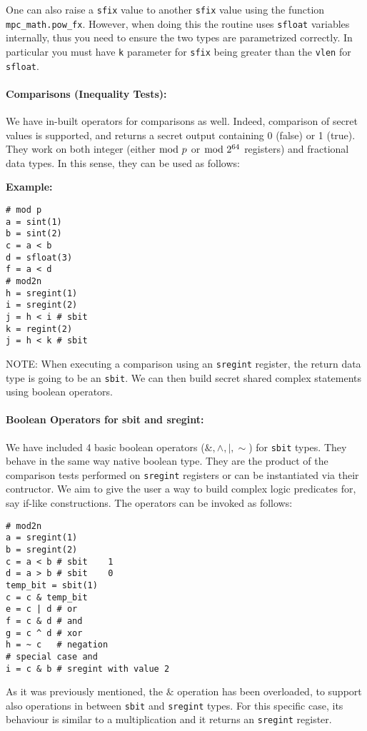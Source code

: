 One can also raise a \verb|sfix| value to another \verb|sfix| value using the
function \verb|mpc_math.pow_fx|. However, when doing this the routine uses
\verb|sfloat| variables internally, thus you need to ensure the two types
are parametrized correctly.
In particular you must have \verb|k| parameter for \verb|sfix| being greater than
the \verb|vlen| for \verb|sfloat|.

\paragraph{Comparisons (Inequality Tests):}
We have in-built operators for comparisons as well.
Indeed, comparison of secret values is supported,
and returns a secret output containing 0 (false) or 1 (true).
They work on both integer (either $\bmod \; p$ or $\bmod \; 2^{64}$ registers) and fractional data types.
In this sense, they can be used as follows:

\noindent
\textbf{Example:}
\begin{lstlisting}
# mod p
a = sint(1)
b = sint(2)
c = a < b
d = sfloat(3)
f = a < d
# mod2n
h = sregint(1)
i = sregint(2)
j = h < i # sbit
k = regint(2)
j = h < k # sbit
\end{lstlisting}

\noindent
NOTE: When executing a comparison using an \verb|sregint| register, the return data type is going to be an \verb|sbit|. We can then build secret shared complex statements using boolean operators.

\paragraph{Boolean Operators for sbit and sregint:}
We have included 4 basic boolean operators ($\&, \wedge, |, \sim$) for \verb|sbit| types.
They behave in the same way native boolean type. They are the product of the
comparison tests performed on \verb|sregint| registers or can be instantiated
via their contructor.
We aim to give the user a way to build complex logic predicates for, say if-like constructions. The operators can be invoked as follows:
\begin{lstlisting}
# mod2n
a = sregint(1)
b = sregint(2)
c = a < b # sbit    1
d = a > b # sbit    0
temp_bit = sbit(1)
c = c & temp_bit
e = c | d # or
f = c & d # and
g = c ^ d # xor
h = ~ c   # negation
# special case and
i = c & b # sregint with value 2
\end{lstlisting}
As it was previously mentioned, the $\&$ operation has been overloaded,
to support also operations in between \verb|sbit| and \verb|sregint| types.
For this specific case, its behaviour is similar to a multiplication and it returns
an \verb|sregint| register.

